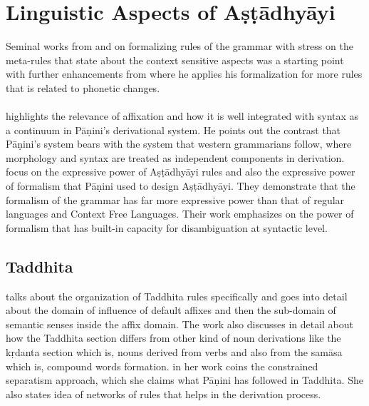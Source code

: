 \documentclass[a4paper,11pt,twoside,openright]{report}
\begin{document}
\section{Linguistic Aspects of Aṣṭādhyāyi}
\label{ling}
 Seminal works from  and   on formalizing rules of the grammar with stress on the meta-rules that state about the context sensitive aspects was a starting point with further enhancements from  where he applies his formalization for more rules that is related to phonetic changes. 
\\ \\
 highlights the relevance of affixation and how it is well integrated with syntax as a continuum in Pāṇini’s derivational system. He points out the contrast that Pāṇini’s system bears with the system that western grammarians follow, where morphology and syntax are treated as independent components in derivation.  focus on the expressive power of
Aṣṭādhyāyi rules and also the expressive power of formalism that Pāṇini used to design
Aṣṭādhyāyi. They demonstrate that the formalism of the grammar has far more expressive power than that of regular languages and Context Free Languages. Their work emphasizes on the power of formalism that has built-in capacity for disambiguation at syntactic level. 
\subsection{Taddhita}
 talks about the organization of Taddhita rules specifically and goes into detail about the domain of influence of default affixes and then the sub-domain of semantic senses inside the affix domain. The work also discusses in detail about how the Taddhita section differs from other kind of noun derivations like the kṛdanta section which is, nouns derived from verbs and also from the samāsa which is, compound words formation.  in her work coins the constrained separatism approach, which she claims what Pāṇini has followed in Taddhita. She also states idea of networks of rules that helps in the derivation process.
\end{document}
